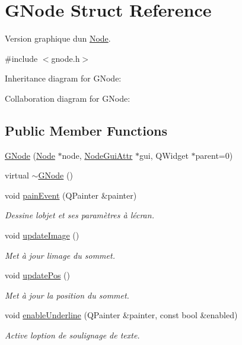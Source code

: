 \hypertarget{struct_g_node}{}\section{G\+Node Struct Reference}
\label{struct_g_node}


Version graphique d\textquotesingle{}un \mbox{\hyperlink{class_node}{Node}}.  




{\ttfamily \#include $<$gnode.\+h$>$}



Inheritance diagram for G\+Node\+:


Collaboration diagram for G\+Node\+:
\subsection*{Public Member Functions}
\begin{DoxyCompactItemize}
\item 
\mbox{\hyperlink{struct_g_node_a2344be00333e7e3c1e481320dab0ab6c}{G\+Node}} (\mbox{\hyperlink{class_node}{Node}} $\ast$node, \mbox{\hyperlink{struct_node_gui_attr}{Node\+Gui\+Attr}} $\ast$gui, Q\+Widget $\ast$parent=0)
\item 
virtual \mbox{\hyperlink{struct_g_node_a126f44e9c70024d22e3766e9188858e0}{$\sim$\+G\+Node}} ()
\item 
void \mbox{\hyperlink{struct_g_node_a380b1efbcfae97d1746ce7f30f983742}{pain\+Event}} (Q\+Painter \&painter)
\begin{DoxyCompactList}\small\item\em Dessine l\textquotesingle{}objet et ses paramètres à l\textquotesingle{}écran. \end{DoxyCompactList}\item 
void \mbox{\hyperlink{struct_g_node_a131f3025a4d61433e58b5d7dbe702820}{update\+Image}} ()
\begin{DoxyCompactList}\small\item\em Met à jour l\textquotesingle{}image du sommet. \end{DoxyCompactList}\item 
void \mbox{\hyperlink{struct_g_node_a3c38a45a7b98a63d3f240d8e62032fb8}{update\+Pos}} ()
\begin{DoxyCompactList}\small\item\em Met à jour la position du sommet. \end{DoxyCompactList}\item 
void \mbox{\hyperlink{struct_g_node_a1828c2a21037df0a85be72c1c65266dd}{enable\+Underline}} (Q\+Painter \&painter, const bool \&enabled)
\begin{DoxyCompactList}\small\item\em Active l\textquotesingle{}option de soulignage de texte. \end{DoxyCompactList}\end{DoxyCompactItemize}
